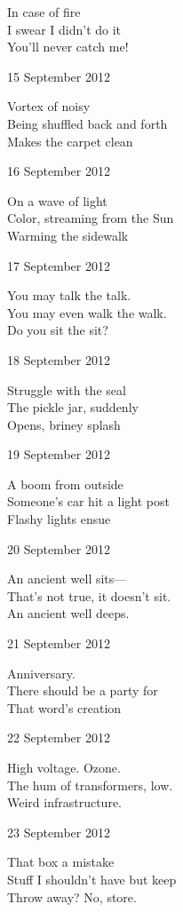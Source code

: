 \documentclass[12pt]{article}
\begin{document}
In case of fire \\
I swear I didn't do it \\
You'll never catch me!

15 September 2012

Vortex of noisy \\
Being shuffled back and forth \\
Makes the carpet clean

16 September 2012

On a wave of light \\
Color, streaming from the Sun \\
Warming the sidewalk


\newpage

17 September 2012

You may talk the talk. \\
You may even walk the walk. \\
Do you sit the sit?

18 September 2012

Struggle with the seal \\
The pickle jar, suddenly \\
Opens, briney splash

19 September 2012

A boom from outside \\
Someone's car hit a light post \\
Flashy lights ensue

20 September 2012

An ancient well sits--- \\
That's not true, it doesn't sit. \\
An ancient well deeps.

21 September 2012

Anniversary. \\
There should be a party for \\
That word's creation

22 September 2012

High voltage. Ozone. \\
The hum of transformers, low. \\
Weird infrastructure.

23 September 2012

That box a mistake \\
Stuff I shouldn't have but keep \\
Throw away? No, store.


\newpage
\end{document}
